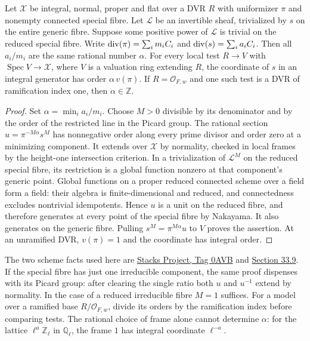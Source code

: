 \begin{lemma}\label{ctwist:vertical}
Let \(\mathcal X\) be integral, normal, proper and flat over a DVR
\(R\) with uniformizer \(\pi\) and nonempty connected special fibre.
Let \(\mathcal L\) be an invertible sheaf, trivialized by \(s\) on the
entire generic fibre. Suppose some positive power of \(\mathcal L\)
is trivial on the reduced special fibre. Write
\({\rm div}(\pi)=\sum_i m_i C_i\) and
\({\rm div}(s)=\sum_i a_i C_i\). Then all \(a_i/m_i\) are the same
rational number \(\alpha\). For every local test \(R\to V\) with
\(\operatorname{Spec}V\to\mathcal X\), where \(V\) is a valuation
ring extending \(R\), the coordinate of \(s\) in an integral generator
has order \(\alpha\,v(\pi)\). If \(R=\mathcal O_{F,w}\) and one
such test is a DVR of ramification index one, then \(\alpha\in\mathbb Z\).
\end{lemma}
\begin{proof}
Set \(\alpha=\min_i a_i/m_i\). Choose \(M>0\) divisible by its
denominator and by the order of the restricted line in the Picard
group. The rational section \(u=\pi^{-M\alpha}s^M\) has nonnegative
order along every prime divisor and order zero at a minimizing
component. It extends over \(\mathcal X\) by normality, checked in
local frames by the height-one intersection criterion.
In a trivialization of \(\mathcal L^M\) on the reduced special
fibre, its restriction is a global function nonzero at that
component's generic point. Global functions on a proper reduced
connected scheme over a field form a field: their algebra is
finite-dimensional and reduced, and connectedness excludes
nontrivial idempotents. Hence \(u\) is a unit on the reduced fibre,
and therefore generates at every point of the special fibre by
Nakayama. It also generates on the generic fibre. Pulling
\(s^M=\pi^{M\alpha}u\) to \(V\) proves the assertion. At an
unramified DVR, \(v(\pi)=1\) and the coordinate has integral order.
\end{proof}
The two scheme facts used here are
\href{https://stacks.math.columbia.edu/tag/0AVB}{Stacks Project,
Tag 0AVB} and
\href{https://stacks.math.columbia.edu/tag/0366}{Section 33.9}.
If the special fibre has just one irreducible component, the same
proof dispenses with its Picard group: after clearing the single
ratio both \(u\) and \(u^{-1}\) extend by normality. In the case
of a reduced irreducible fibre \(M=1\) suffices. For a model over
a ramified base \(R/\mathcal O_{F,w}\), divide its orders by the
ramification index before comparing tests. The rational choice of
frame alone cannot determine \(\alpha\): for the lattice
\(\ell^a\mathbb Z_\ell\) in \(\mathbb Q_\ell\), the frame \(1\)
has integral coordinate \(\ell^{-a}\).

